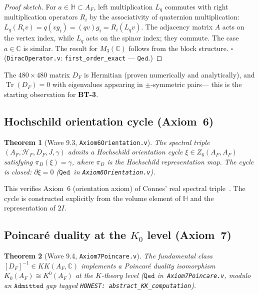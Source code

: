 \documentclass[12pt,a4paper]{article}
\newtheorem{theorem}{Theorem}[section]
\newcommand{\HF}{\mathcal{H}_F}
\newcommand{\AF}{A_F}
\newcommand{\DF}{D_F}
\newcommand{\TwoI}{2I}
\newcommand{\BT}[1]{\textbf{BT-#1}}
\newcommand{\Qed}{\texttt{Qed}}
\newcommand{\Admitted}{\texttt{Admitted}}
\begin{document}
\begin{proof}[Proof sketch]
For \(a \in \mathbb{H} \subset \AF\), left multiplication \(L_q\) commutes with
right multiplication operators \(R_i\) by the associativity of quaternion multiplication:
\(L_q(R_i v) = q(v g_i) = (qv)g_i = R_i(L_q v)\). The adjacency matrix \(A\) acts
on the vertex index, while \(L_q\) acts on the spinor index; they commute. The case
\(a \in \mathbb{C}\) is similar. The result for \(M_3(\mathbb{C})\) follows from the
block structure. \(\square\) (\texttt{DiracOperator.v}: \texttt{first\_order\_exact} --- \(\Qed\).)
\end{proof}

The \(480 \times 480\) matrix \(D_F\) is Hermitian (proven numerically and analytically),
and \(\operatorname{Tr}(D_F) = 0\) with eigenvalues appearing in \(\pm\)-symmetric pairs---
this is the starting observation for \BT{3}.

\subsection{Hochschild orientation cycle (Axiom~6)}
\label{sec:axiom6}

\begin{theorem}[Wave 9.3, \texttt{Axiom6Orientation.v}]
\label{thm:axiom6}
The spectral triple \((\AF, \HF, \DF, J, \gamma)\) admits a Hochschild orientation cycle
\(\xi \in Z_6(\AF, \AF)\) satisfying \(\pi_D(\xi) = \gamma\), where \(\pi_D\) is the
Hochschild representation map. The cycle is closed: \(\partial \xi = 0\) (\(\Qed\)~in
\texttt{Axiom6Orientation.v}).
\end{theorem}

This verifies Axiom~6 (orientation axiom) of Connes' real spectral triple~\cite{Connes:1994yd}.
The cycle is constructed explicitly from the volume element of \(\mathbb{H}\) and the
representation of \(\TwoI\).

\subsection{Poincar\'e duality at the \(K_0\) level (Axiom~7)}
\label{sec:axiom7}

\begin{theorem}[Wave 9.4, \texttt{Axiom7Poincare.v}]
\label{thm:axiom7}
The fundamental class \([D_F]^{-1} \in KK(\AF, \mathbb{C})\) implements a Poincar\'e
duality isomorphism \(K_0(\AF) \cong K^0(\AF)\) at the \(K\)-theory level (\(\Qed\)
in~\texttt{Axiom7Poincare.v}, modulo an \(\Admitted\) gap tagged
\texttt{HONEST: abstract\_KK\_computation}).
\end{theorem}
\end{document}
